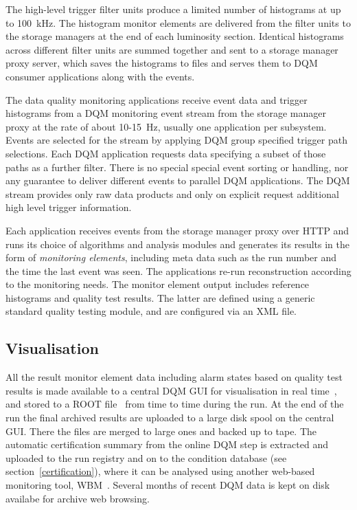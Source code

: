 \documentclass[a4paper]{jpconf}
\begin{document}
The high-level trigger filter units produce a limited number of histograms at
up to 100~kHz.  The histogram monitor elements are delivered from the filter
units to the storage managers at the end of each luminosity section.
Identical histograms across different filter units are summed together and
sent to a storage manager proxy server, which saves the histograms to files
and serves them to DQM consumer applications along with the events.

The data quality monitoring applications receive event data and trigger
histograms from a DQM monitoring event stream from the storage manager proxy
at the rate of about 10-15~Hz, usually one application per subsystem.  Events
are selected for the stream by applying DQM group specified trigger path
selections.  Each DQM application requests data specifying a subset of those
paths as a further filter.  There is no special special event sorting or
handling, nor any guarantee to deliver different events to parallel DQM
applications.  The DQM stream provides only raw data products and only on
explicit request additional high level trigger information.

Each application receives events from the storage manager proxy over HTTP and
runs its choice of algorithms and analysis modules and generates its results
in the form of {\em monitoring elements}, including meta data such as the run
number and the time the last event was seen.  The applications re-run
reconstruction according to the monitoring needs.  The monitor element output
includes reference histograms and quality test results.  The latter are defined
using a generic standard quality testing module, and are configured via an XML
file.

\subsection{Visualisation}

All the result monitor element data including alarm states based on quality
test results is made available to a central DQM GUI for visualisation in real
time~\cite{dqm_gui_09}, and stored to a ROOT file~\cite{root} from time to
time during the run.  At the end of the run the final archived results are
uploaded to a large disk spool on the central GUI.  There the files are merged
to large ones and backed up to tape.  The automatic certification summary from
the online DQM step is extracted and uploaded to the run registry and on to
the condition database (see section~\ref{certification}), where it can be
analysed using another web-based monitoring tool, WBM~\cite{wbm}.  Several
months of recent DQM data is kept on disk availabe for archive web browsing.
\end{document}
